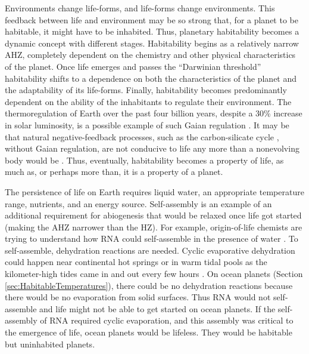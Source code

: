 Environments change life-forms, and life-forms change environments. This feedback between life and environment may be so strong that, for a planet to be habitable, it might have to be inhabited. Thus, planetary habitability becomes a dynamic concept with different stages. Habitability begins as a relatively narrow AHZ, completely dependent on the chemistry and other physical characteristics of the planet. Once life emerges and passes the ``Darwinian threshold'' \citep{Woese2002} habitability shifts to a dependence on both the characteristics of the planet and the adaptability of its life-forms. Finally, habitability becomes predominantly dependent on the ability of the inhabitants to regulate their environment. The thermoregulation of Earth over the past four billion years, despite a 30\% increase in solar luminosity, is a possible example of such Gaian regulation \citep{Lovelock1965,Lovelock2000,Lovelock1974,Schneider1991,Schneider2004}. It may be that natural negative-feedback processes, such as the carbon-silicate cycle \citep{Walker1981}, without Gaian regulation, are not conducive to life any more than a nonevolving body would be \citep{Schwartzman1989}. Thus, eventually, habitability becomes a property of life, as much as, or perhaps more than, it is a property of a planet.

The persistence of life on Earth requires liquid water, an appropriate temperature range, nutrients, and an energy source. Self-assembly is an example of an additional requirement for abiogenesis that would be relaxed once life got started (making the AHZ narrower than the HZ). For example, origin-of-life chemists are trying to understand how RNA could self-assemble in the presence of water \citep[\eg][]{Szostak2001}. To self-assemble, dehydration reactions are needed. Cyclic evaporative dehydration could happen near continental hot springs or in warm tidal pools as the kilometer-high tides came in and out every few hours \citep[\eg][]{Lathe2004}. On ocean planets (Section \ref{sec:HabitableTemperatures}), there could be no dehydration reactions because there would be no evaporation from solid surfaces. Thus RNA would not self-assemble and life might not be able to get started on ocean planets. If the self-assembly of RNA required cyclic evaporation, and this assembly was critical to the emergence of life, ocean planets would be lifeless. They would be habitable but uninhabited planets.

